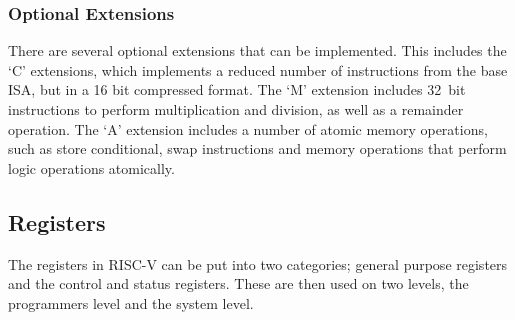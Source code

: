 \subsubsection{Optional Extensions}
There are several optional extensions that can be implemented. This includes the `C' extensions, which implements a reduced number of instructions from the base ISA, but in a 16 bit compressed format. The `M' extension includes 32~bit instructions to perform multiplication and division, as well as a remainder operation. The `A' extension includes a number of atomic memory operations, such as store conditional, swap instructions and memory operations that perform logic operations atomically.
\subsection{Registers}
The registers in RISC-V can be put into two categories; general purpose registers and the control and status registers. These are then used on two levels, the programmers level and the system level.
